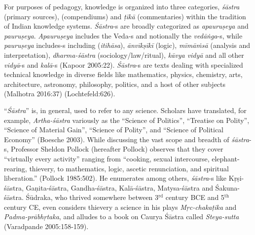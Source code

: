 For purposes of pedagogy, knowledge is organized into three categories, {\sl śāstra} (primary sources), (compendiums) and {\sl ṭīkā} (commentaries) within the tradition of Indian knowledge systems. {\sl Śāstra}-s are broadly categorized as {\sl apauruṣeya} and {\sl pauruṣeya}. {\sl Apauruṣeya} includes the Veda-s and notionally the {\sl vedāṅga}-s, while {\sl pauruṣeya} includes-s including ({\sl itihāsa}), {\sl ānvīkṣīkī} (logic), {\sl mīmāṁsā} (analysis and interpretation), {\sl dharma-śāstra} (sociology/law/ritual), {\sl kāvya vidyā} and all other {\sl vidyā}-s and {\sl kalā}-s (Kapoor 2005:22). {\sl Śāstra}-s are texts dealing with specialized technical knowledge in diverse fields like mathematics, physics, chemistry, arts, architecture, astronomy, philosophy, politics, and a host of other subjects (Malhotra 2016:37) (Lochtefeld:626). 

``{\sl Śāstra}'' is, in general, used to refer to any science. Scholars have translated, for example, {\sl Artha-śāstra} variously as the ``Science of Politics'', ``Treatise on Polity'', ``Science of Material Gain'', ``Science of Polity'', and ``Science of Political Economy'' (Boesche 2003). While discussing the vast scope and breadth of {\sl śāstra}-s, Professor Sheldon Pollock (hereafter Pollock) observes that they cover ``virtually every activity'' ranging from ``cooking, sexual intercourse, elephant-rearing, thievery, to mathematics, logic, ascetic renunciation, and spiritual liberation.'' (Pollock 1985:502). He enumerates among others, \hbox{{\sl śāstra}-s} like Kṛṣi-śāstra, Gaṇita-śāstra, Gandha-śāstra, Kalā-śāstra, Matysa-śāstra and Śakuna-śāstra. Śūdraka, who thrived somewhere between 3$^{\text{rd}}$ century BCE and 5$^{\text{th}}$ century CE, even considers thievery a science in his plays {\sl Mṛc-chakaṭika} and {\sl Padma-prābhṛtaka},  and alludes to a book on Caurya Śāstra called {\sl Steya-sutta} (Varadpande 2005:158-159).

